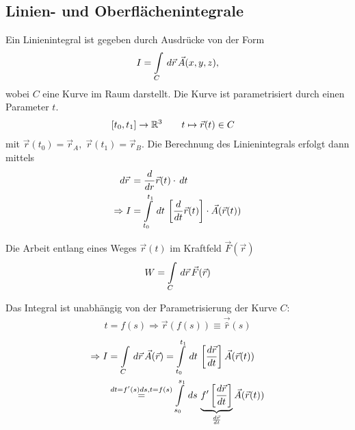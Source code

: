 \subsection{Linien- und Oberflächenintegrale}

Ein Linienintegral ist gegeben durch Ausdrücke von der Form
\begin{align*}
I = \int \limits_{C} \,d\vec{r}\,\vec{A}(x,y,z),
\end{align*}
wobei $C$ eine Kurve im Raum darstellt. Die Kurve ist parametrisiert durch
einen Parameter $t$.
\begin{align*}
&[t_0,t_1] \to \mathbb{R}^3\qquad t \mapsto \vec{r}(t) \in C
\end{align*}
mit $\vec{r}(t_0) = \vec{r}_A,\; \vec{r}(t_1) = \vec{r}_B$. Die Berechnung des
Linienintegrals erfolgt dann mittels
\begin{align*}
\,d\vec{r}\,&= \frac{d}{dr}\vec{r}(t) \cdot \,dt\,\\
\Rightarrow I &= \int \limits_{t_0}^{t_1} \,dt\, \left[ \frac{d}{dt}\vec{r}(t)
\right]\cdot \vec{A}(\vec{r}(t))
\end{align*}

\begin{Beispiel}
Die Arbeit entlang eines Weges $\vec{r}(t)$ im Kraftfeld $\vec{F}(\vec{r})$
\begin{align*}
W = \int \limits_{C} \,d\vec{r}\, \vec{F}(\vec{r})
\end{align*}
\end{Beispiel}

\begin{Bemerkung}
Das Integral ist unabhängig von der Parametrisierung der Kurve $C$:
\begin{align*}
t = f(s) \Rightarrow \vec{r}(f(s)) \equiv \vec{\hat{r}}(s)
\end{align*}
\begin{align*}
\Rightarrow I &= \int \limits_{C} \,d\vec{r}\, \vec{A}(\vec{r}) = \int
\limits_{t_0}^{t_1} \,dt\, \left[ \frac{d\vec{r}}{dt}\right]
\vec{A}(\vec{r}(t))\\
& \overset{dt = f'(s)ds,t = f(s)}{=} \int \limits_{s_0}^{s_1} \,ds\, \underbrace{f'
\left[ \frac{d\vec{r}}{dt} \right]}_{\frac{d\vec{r}}{dt}} \vec{A}(\vec{r}(t))
\end{align*}
\end{Bemerkung}


